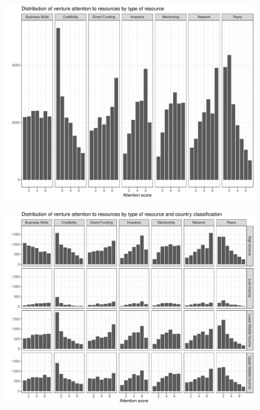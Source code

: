 \documentclass[
  english,
  man]{apa6}
\begin{document}
\begin{figure}[!H]
\includegraphics{Manuscript_files/figure-latex/unnamed-chunk-7-1} \caption{ }\label{fig:unnamed-chunk-7-1}
\end{figure}
\begin{figure}[!H]
\includegraphics{Manuscript_files/figure-latex/unnamed-chunk-7-2} \caption{ }\label{fig:unnamed-chunk-7-2}
\end{figure}
\end{document}
